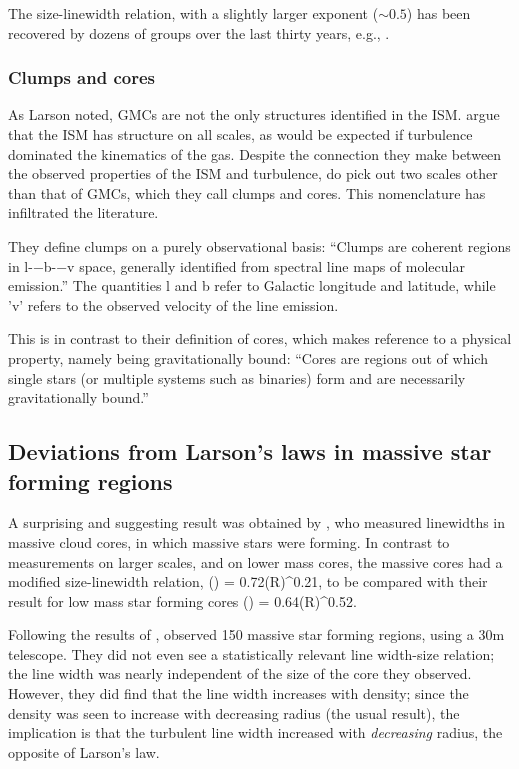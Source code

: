 \documentclass[../dissertation.tex]{subfiles}
\begin{document}
The size-linewidth relation, with a slightly larger exponent ($\sim0.5$) has been recovered by dozens of groups over the last thirty years, e.g., \citet{1987ApJ...319..730S,2008ApJ...679.1338R,2017ApJ...834...57M}.

\subsubsection{Clumps and cores}
As Larson noted, GMCs are not the only structures identified in the ISM. \citet{2000prpl.conf...97W}  argue that the ISM has structure on all scales, as would be expected if turbulence dominated the kinematics of the gas. Despite the connection they make between the observed properties of the ISM and turbulence, \citet{2000prpl.conf...97W}  do pick out two scales other than that of GMCs, which they call clumps and cores. This nomenclature has infiltrated the literature.

They define clumps on a purely observational basis: ``Clumps are coherent regions in l-−b-−v space, generally identified from spectral line maps of molecular emission.'' The quantities l and b refer to Galactic longitude and latitude, while 'v' refers to the observed velocity of the line emission.

This is in contrast to their definition of cores, which makes reference to a physical property, namely being gravitationally bound: ``Cores are regions out of which single stars (or multiple systems such as binaries) form and are necessarily gravitationally bound.''

\subsection{Deviations from Larson's laws in massive star forming regions}

A surprising and suggesting result was obtained by \citet{1995ApJ...446..665C},%
who measured linewidths in massive cloud cores, in which massive stars were forming. In contrast to measurements on larger scales, and on lower mass cores, the massive cores had a modified size-linewidth relation,
%
\be
\left({\sigma\over \kms}\right) = 0.72\left({R\over \pc}\right)^{0.21},
\ee
%
to be compared with their result for low mass star forming cores
%
\be
\left({\sigma\over \kms}\right) = 0.64\left({R\over \pc}\right)^{0.52}.
\ee
%


Following the results of \citet{1995ApJ...446..665C}, 
\citet{1997ApJ...476..730P} observed 150 massive star forming regions, using a 30m telescope. %
They did not even see a statistically relevant line width-size relation; the line width was nearly independent of the size of the core they observed.
However, they did find that the line width increases with density; since the density was seen to increase with decreasing radius (the usual result), the implication is that the turbulent line width increased with {\em decreasing} radius, the opposite of Larson's law.
\end{document}
